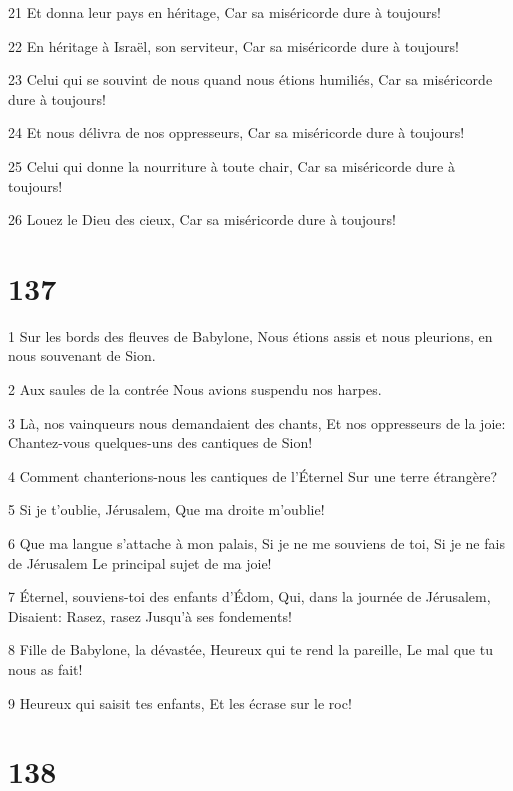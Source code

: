 \par 21 Et donna leur pays en héritage, Car sa miséricorde dure à toujours!
\par 22 En héritage à Israël, son serviteur, Car sa miséricorde dure à toujours!
\par 23 Celui qui se souvint de nous quand nous étions humiliés, Car sa miséricorde dure à toujours!
\par 24 Et nous délivra de nos oppresseurs, Car sa miséricorde dure à toujours!
\par 25 Celui qui donne la nourriture à toute chair, Car sa miséricorde dure à toujours!
\par 26 Louez le Dieu des cieux, Car sa miséricorde dure à toujours!

\chapter{137}

\par 1 Sur les bords des fleuves de Babylone, Nous étions assis et nous pleurions, en nous souvenant de Sion.
\par 2 Aux saules de la contrée Nous avions suspendu nos harpes.
\par 3 Là, nos vainqueurs nous demandaient des chants, Et nos oppresseurs de la joie: Chantez-vous quelques-uns des cantiques de Sion!
\par 4 Comment chanterions-nous les cantiques de l'Éternel Sur une terre étrangère?
\par 5 Si je t'oublie, Jérusalem, Que ma droite m'oublie!
\par 6 Que ma langue s'attache à mon palais, Si je ne me souviens de toi, Si je ne fais de Jérusalem Le principal sujet de ma joie!
\par 7 Éternel, souviens-toi des enfants d'Édom, Qui, dans la journée de Jérusalem, Disaient: Rasez, rasez Jusqu'à ses fondements!
\par 8 Fille de Babylone, la dévastée, Heureux qui te rend la pareille, Le mal que tu nous as fait!
\par 9 Heureux qui saisit tes enfants, Et les écrase sur le roc!

\chapter{138}

